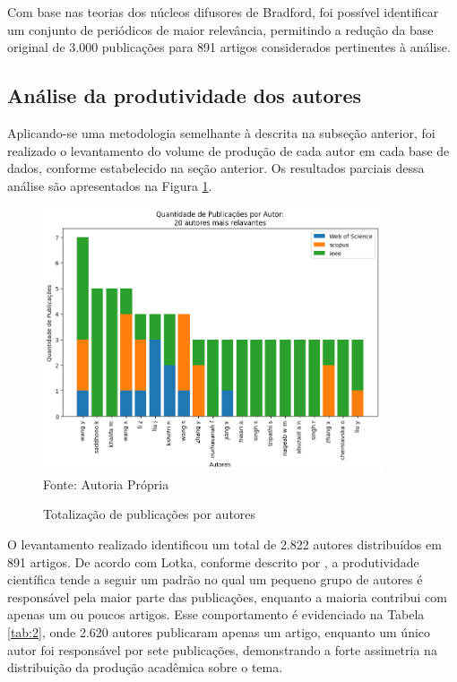 \documentclass[openany,oneside,a4paper,9pt]{extarticle}
\begin{document}
Com base nas teorias dos núcleos difusores de Bradford, foi possível identificar um conjunto de periódicos de maior relevância, permitindo a redução da base original de 3.000 publicações para 891 artigos considerados pertinentes à análise.

\subsection{Análise da produtividade dos autores}

Aplicando-se uma metodologia semelhante à descrita na subseção anterior, foi realizado o levantamento do volume de produção de cada autor em cada base de dados, conforme estabelecido na seção anterior. Os resultados parciais dessa análise são apresentados na Figura \ref{fig:4}.

\begin{figure}[H]
    \centering
    \caption{Totalização de publicações por autores}
    \includegraphics[width=10cm]{publicacoes_autores.png}
    \label{fig:4}
    {\\\footnotesize Fonte: Autoria Própria}
\end{figure}

O levantamento realizado identificou um total de 2.822 autores distribuídos em 891 artigos. De acordo com Lotka, conforme descrito por \textcite{melo2017bibliometria}, a produtividade científica tende a seguir um padrão no qual um pequeno grupo de autores é responsável pela maior parte das publicações, enquanto a maioria contribui com apenas um ou poucos artigos. Esse comportamento é evidenciado na Tabela \ref{tab:2}, onde 2.620 autores publicaram apenas um artigo, enquanto um único autor foi responsável por sete publicações, demonstrando a forte assimetria na distribuição da produção acadêmica sobre o tema.
\end{document}
